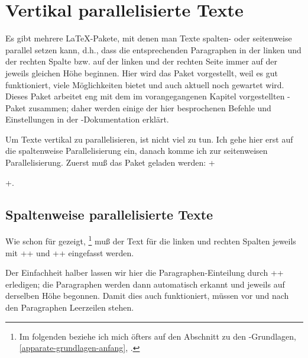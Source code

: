 
\newcommand\reledpar{\mbox{\Package{reledpar}}\xspace}

\section{Vertikal parallelisierte Texte}

\DefineShortVerb{\+}


\noindent Es gibt mehrere \LaTeX-Pakete, mit denen man Texte spalten- oder seitenweise parallel setzen kann, d.h., dass die entsprechenden Paragraphen in der linken und der rechten Spalte bzw. auf der linken und der rechten Seite immer auf der jeweils gleichen Höhe beginnen.
Hier wird das Paket \reledpar vorgestellt, weil es gut funktioniert, viele Möglichkeiten bietet und auch aktuell noch gewartet wird.
Dieses Paket arbeitet eng mit dem im vorangegangenen Kapitel vorgestellten \reledmac-Paket zusammen; daher werden einige der hier besprochenen Befehle und Einstellungen in der \reledmac-Dokumentation erklärt.

Um Texte vertikal zu parallelisieren, ist nicht viel zu tun. Ich gehe hier erst auf die spaltenweise Parallelisierung ein, danach komme ich zur seitenweisen Parallelisierung. Zuerst muß das Paket geladen werden: +\usepackage{reledpar}+.


\subsection{Spaltenweise parallelisierte Texte}

Wie schon für \reledmac gezeigt,%
\footnote{Im folgenden beziehe ich mich öfters auf den Abschnitt zu den \reledmac-Grundlagen, \cref{apparate-grundlagen-anfang}, .}
muß der Text für die linken und rechten Spalten jeweils mit +\beginnumbering+ und +\endnumbering+ eingefasst werden.%

Der Einfachheit halber lassen wir hier die Paragraphen-Einteilung durch +\autopar+ erledigen;
die Paragraphen werden dann automatisch erkannt und jeweils auf derselben Höhe begonnen.
Damit dies auch funktioniert, müssen vor und nach den Paragraphen Leerzeilen stehen.

